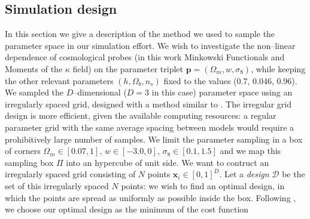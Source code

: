 \documentclass[reprint,aps,prd,superscriptaddress,showkeys,showpacs]{revtex4-1}
\begin{document}
\subsection{Simulation design}
In this section we give a description of the method we used to sample the parameter space in our simulation effort. We wish to investigate the non--linear dependence of cosmological probes (in this work Minkowski Functionals and Moments of the $\kappa$ field) on the parameter triplet $\mathbf{p}=(\Omega_m,w,\sigma_8)$, while keeping the other relevant parameters $(h,\Omega_b,n_s)$ fixed to the values (0.7, 0.046, 0.96). We sampled the $D$--dimensional ($D=3$ in this case) parameter space using an irregularly spaced grid, designed with a method similar to \citep{coyote2}. The irregular grid design is more efficient, given the available computing resources: a regular parameter grid with the same average spacing between models would require a prohibitively large number of samples. We limit the parameter sampling in a box of corners $\Omega_m\in[0.07,1],\,w\in[-3.0,0],\,\sigma_8\in[0.1,1.5]$ and we map this sampling box $\Pi$ into an hypercube of unit side. We want to contruct an irregularly spaced grid consisting of $N$ points $\mathbf{x}_i\in[0,1]^D$. Let a \textit{design} $\mathcal{D}$ be the set of this irregularly spaced $N$ points: we wish to find an optimal design, in which the points are spread as uniformly as possible inside the box. Following \citep{coyote2}, we choose our optimal design as the minimum of the cost function

\end{document}
